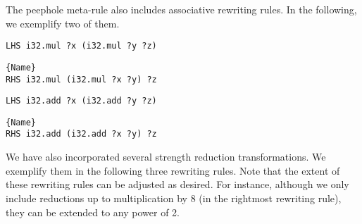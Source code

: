 The peephole meta-rule also includes associative rewriting rules.
In the following, we exemplify two of them.


\begin{minipage}{0.95\linewidth}
\begin{minipage}{0.49\linewidth}
    
    \lstset{
    language=ttt,
    style=watcode,
    basicstyle=\footnotesize\ttfamily,
    columns=fullflexible,
    breaklines=true}
    \begin{lstlisting}[]
LHS i32.mul ?x (i32.mul ?y ?z)
            \end{lstlisting}\vspace{-0.5cm}
    \noindent\hrulefill
        \lstset{
            language=ttt,
            style=watcode,
            basicstyle=\footnotesize\ttfamily,
            columns=fullflexible,
            breaklines=true}
            \vspace{-0.2cm}
            \begin{lstlisting}[numbers=none]{Name}
RHS i32.mul (i32.mul ?x ?y) ?z
    \end{lstlisting}
\end{minipage}
\begin{minipage}{0.49\linewidth}
    \lstset{
    language=ttt,
    style=watcode,
    basicstyle=\footnotesize\ttfamily,
    columns=fullflexible,
    breaklines=true}
    \begin{lstlisting}[]
LHS i32.add ?x (i32.add ?y ?z)
            \end{lstlisting}\vspace{-0.5cm}
    \noindent\hrulefill
        \lstset{
            language=ttt,
            style=watcode,
            basicstyle=\footnotesize\ttfamily,
            columns=fullflexible,
            breaklines=true}
            \vspace{-0.2cm}
            \begin{lstlisting}[numbers=none]{Name}
RHS i32.add (i32.add ?x ?y) ?z
    \end{lstlisting}
\end{minipage}    
\end{minipage}

We have also incorporated several strength reduction transformations.
We exemplify them in the following three rewriting rules.
Note that the extent of these rewriting rules can be adjusted as desired.
For instance, although we only include reductions up to multiplication by 8 (in the rightmost rewriting rule), they can be extended to any power of 2.

